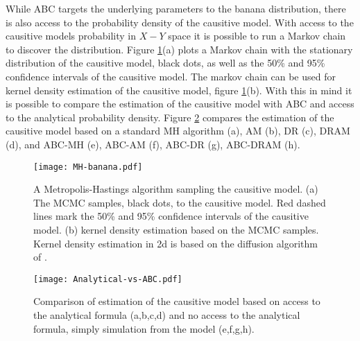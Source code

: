 While ABC targets the underlying parameters to the banana distribution, there is also access to the probability density of the causitive model. With access to the causitive models probability in $X-Y$ space it is possible to run a Markov chain to discover the distribution. Figure \ref{Analytical-banana}(a) plots a Markov chain with the stationary distribution of the causitive model, black dots, as well as the 50\% and 95\% confidence intervals of the causitive model. The markov chain can be used for kernel density estimation of the causitive model, figure \ref{Analytical-banana}(b). With this in mind it is possible to compare the estimation of the causitive model with ABC and access to the analytical probability density. Figure \ref{the-comparison} compares the estimation of the causitive model based on a standard MH algorithm (a), AM (b), DR (c), DRAM (d), and ABC-MH (e), ABC-AM (f), ABC-DR (g), ABC-DRAM (h). 

\begin{figure}[H]
\centering
\texttt{[image: MH-banana.pdf]}
\caption{A Metropolis-Hastings algorithm sampling the causitive model. (a) The MCMC samples, black dots, to the causitive model. Red dashed lines mark the 50\% and 95\% confidence intervals of the causitive model. (b) kernel density estimation based on the MCMC samples. Kernel density estimation in 2d is based on the diffusion algorithm of \citet{Botev2010}.}
\label{Analytical-banana}
\end{figure}

\begin{figure}[H]
\centering
\texttt{[image: Analytical-vs-ABC.pdf]}
\caption{Comparison of estimation of the causitive model based on access to the analytical formula (a,b,c,d) and no access to the analytical formula, simply simulation from the model (e,f,g,h).}
\label{the-comparison}
\end{figure}


